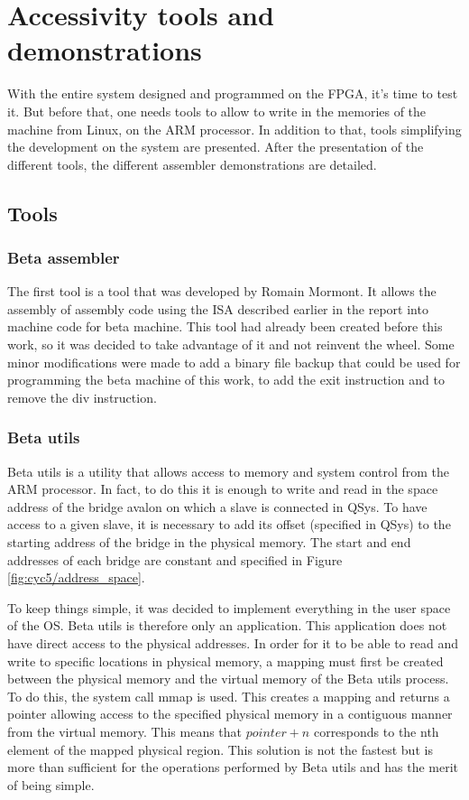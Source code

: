 \chapter{Accessivity tools and demonstrations}

With the entire system designed and programmed on the FPGA, it's time to test it. But before that, 
one needs tools to allow to write in the memories of the machine from Linux, on the ARM processor. 
In addition to that, tools simplifying the development on the system are presented. After the 
presentation of the different tools, the different assembler demonstrations are detailed.

\section{Tools}

\subsection{Beta assembler}

The first tool is a tool that was developed by Romain Mormont. It allows the assembly of assembly 
code using the ISA described earlier in the report into machine code for beta machine. This tool 
had already been created before this work, so it was decided to take advantage of it and not 
reinvent the wheel. Some minor modifications were made to add a binary file backup that could be 
used for programming the beta machine of this work, to add the exit instruction and to remove the 
div instruction.

\subsection{Beta utils}

Beta utils is a utility that allows access to memory and system control from the ARM processor. In 
fact, to do this it is enough to write and read in the space address of the bridge avalon on which
a slave is connected in QSys. To have access to a given slave, it is necessary to add its offset 
(specified in QSys) to the starting address of the bridge in the physical memory. The start and end 
addresses of each bridge are constant and specified in Figure \ref{fig:cyc5/address_space}. 

To keep things simple, it was decided to implement everything in the user space of the OS. Beta 
utils is therefore only an application. This application does not have direct access to the 
physical addresses. In order for it to be able to read and write to specific locations in physical 
memory, a mapping must first be created between the physical memory and the virtual memory of the 
Beta utils process. To do this, the system call mmap is used. This creates a mapping and returns a 
pointer allowing access to the specified physical memory in a contiguous manner from the virtual 
memory. This means that $pointer + n$ corresponds to the nth element of the mapped physical region. 
This solution is not the fastest but is more than sufficient for the operations performed by Beta 
utils and has the merit of being simple. 

